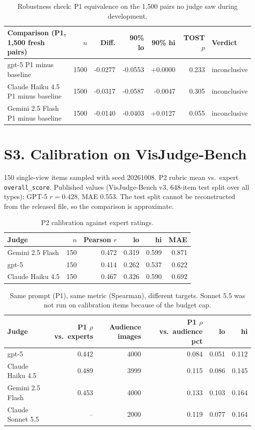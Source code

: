 \documentclass[10pt]{article}
\begin{document}
\begin{table}[h]\centering\small
\caption{Robustness check: P1 equivalence on the 1,500 pairs no judge saw during development.}
\begin{tabular}{lrrrrrl}
\toprule
Comparison (P1, 1,500 fresh pairs) & $n$ & Diff. & 90\% lo & 90\% hi & TOST $p$ & Verdict \\
\midrule
gpt-5 P1 minus baseline & 1500 & -0.0277 & -0.0553 & +0.0000 & 0.233 & inconclusive \\
Claude Haiku 4.5 P1 minus baseline & 1500 & -0.0317 & -0.0587 & -0.0047 & 0.305 & inconclusive \\
Gemini 2.5 Flash P1 minus baseline & 1500 & -0.0140 & -0.0403 & +0.0127 & 0.055 & inconclusive \\
\bottomrule
\end{tabular}
\end{table}

\section*{S3. Calibration on VisJudge-Bench}
150 single-view items sampled with seed 20261008. P2 rubric mean vs.\ expert \texttt{overall\_score}. Published values (VisJudge-Bench v3, 648-item test split over all types): GPT-5 $r=0.428$, MAE 0.553. The test split cannot be reconstructed from the released file, so the comparison is approximate.

\begin{table}[h]\centering\small
\caption{P2 calibration against expert ratings.}
\begin{tabular}{lrrrrr}
\toprule
Judge & $n$ & Pearson $r$ & lo & hi & MAE \\
\midrule
Gemini 2.5 Flash & 150 & 0.472 & 0.319 & 0.599 & 0.871 \\
gpt-5 & 150 & 0.414 & 0.262 & 0.537 & 0.622 \\
Claude Haiku 4.5 & 150 & 0.467 & 0.326 & 0.590 & 0.692 \\
\bottomrule
\end{tabular}
\end{table}

\begin{table}[h]\centering\small
\caption{Same prompt (P1), same metric (Spearman), different targets. Sonnet 5.5 was not run on calibration items because of the budget cap.}
\begin{tabular}{lrrrrr}
\toprule
Judge & P1 $\rho$ vs.\ experts & Audience images & P1 $\rho$ vs.\ audience pct & lo & hi \\
\midrule
gpt-5 & 0.442 & 4000 & 0.084 & 0.051 & 0.112 \\
Claude Haiku 4.5 & 0.489 & 3999 & 0.115 & 0.086 & 0.145 \\
Gemini 2.5 Flash & 0.453 & 4000 & 0.133 & 0.103 & 0.164 \\
Claude Sonnet 5.5 & -- & 2000 & 0.119 & 0.077 & 0.164 \\
\bottomrule
\end{tabular}
\end{table}
\end{document}
